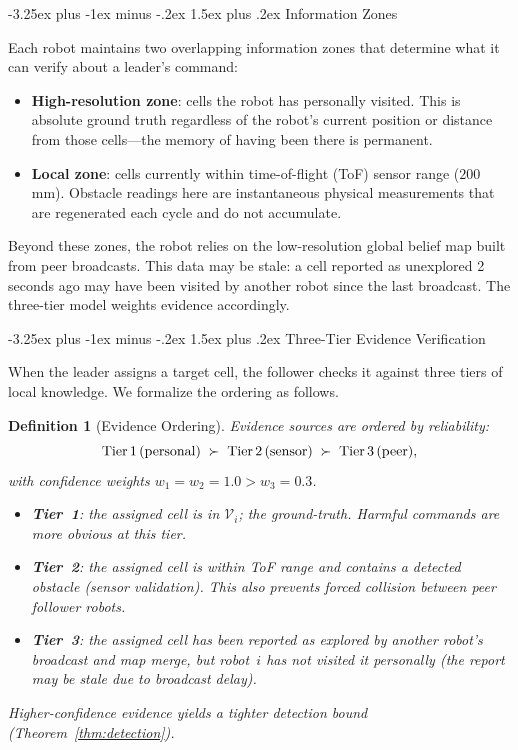 \documentclass[conference]{IEEEtran}
\makeatletter
\newtheorem{definition}{Definition}
\renewcommand{\subsection}{\@startsection{subsection}{2}{\z@}%
  {-3.25ex plus -1ex minus -.2ex}%
  {1.5ex plus .2ex}%
  {\normalfont\normalsize\itshape\centering}}
\makeatother
\begin{document}
\subsection{Information Zones}
\label{sec:info_zones}

Each robot maintains two overlapping information zones that determine what it can verify about a leader's command:

\begin{itemize}
    \item \textbf{High-resolution zone}: cells the robot has personally visited. This is absolute ground truth regardless of the robot's current position or distance from those cells---the memory of having been there is permanent.
    \item \textbf{Local zone}: cells currently within time-of-flight (ToF) sensor range ($200\,$mm). Obstacle readings here are instantaneous physical measurements that are regenerated each cycle and do not accumulate.

\end{itemize}

Beyond these zones, the robot relies on the low-resolution global belief map built from peer broadcasts. This data may be stale: a cell reported as unexplored 2 seconds ago may have been visited by another robot since the last broadcast. The three-tier model weights evidence accordingly.

\subsection{Three-Tier Evidence Verification}
\label{sec:hw_trust}

When the leader assigns a target cell, the follower checks it against three tiers of local knowledge. We formalize the ordering as follows.

\begin{definition}[Evidence Ordering]
\label{def:evidence}
Evidence sources are ordered by reliability:
\[
    \text{Tier\,1\,(personal)} \;\succ\;
    \text{Tier\,2\,(sensor)} \;\succ\;
    \text{Tier\,3\,(peer)},
\]
with confidence weights $w_1 = w_2 = 1.0 > w_3 = 0.3$.
\begin{itemize}[nosep]
    \item \textbf{Tier~1}: the assigned cell is in $\mathcal{V}_i$; the ground-truth. Harmful commands are more obvious at this tier.
    \item \textbf{Tier~2}: the assigned cell is within ToF range and contains a detected obstacle (sensor validation). This also prevents forced collision between peer follower robots.
    \item \textbf{Tier~3}: the assigned cell has been reported as explored by another robot's broadcast and map merge, but robot~$i$ has not visited it personally (the report may be stale due to broadcast delay).
\end{itemize}
Higher-confidence evidence yields a tighter detection bound (Theorem~\ref{thm:detection}).
\end{definition}
\end{document}

